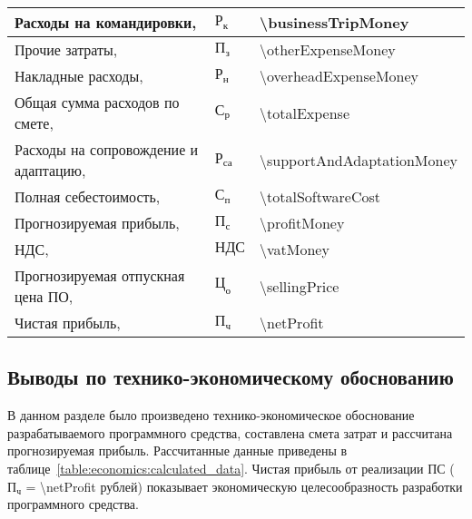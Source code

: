 \begin{longtable}{| >{\raggedright}m{}
                  | >{\centering}m{}
                  | >{\centering\arraybackslash}m{}|}
    Расходы на командировки, \byr{}
    & $ \text{Р}_\text{к} $
    & \num{\businessTripMoney}
    \\ \hline

    Прочие затраты, \byr{}
    & $ \text{П}_\text{з} $
    & \num{\otherExpenseMoney}
    \\ \hline

    Накладные расходы, \byr{}
    & $ \text{Р}_\text{н} $
    & \num{\overheadExpenseMoney}
    \\ \hline

    Общая сумма расходов по смете, \byr{}
    & $ \text{С}_\text{р} $
    & \num{\totalExpense}
    \\ \hline

    Расходы на сопровождение и адаптацию, \byr{}
    & $ \text{Р}_\text{са} $
    & \num{\supportAndAdaptationMoney}
    \\ \hline

    Полная себестоимость, \byr{}
    & $ \text{С}_\text{п} $
    & \num{\totalSoftwareCost}
    \\ \hline

    Прогнозируемая прибыль, \byr{}
    & $ \text{П}_\text{с} $
    & \num{\profitMoney}
    \\ \hline

    НДС, \byr{}
    & $ \text{НДС} $
    & \num{\vatMoney}
    \\ \hline

    Прогнозируемая отпускная цена ПО, \byr{}
    & $ \text{Ц}_\text{о} $
    & \num{\sellingPrice}
    \\ \hline

    Чистая прибыль, \byr{}
    & $ \text{П}_\text{ч} $
    & \num{\netProfit}
    \\ \hline
\end{longtable}

\subsection{Выводы по технико-экономическому обоснованию}

В данном разделе было произведено технико-экономическое обоснование разрабатываемого программного средства, составлена смета затрат и рассчитана прогнозируемая прибыль. Рассчитанные данные приведены в таблице~\ref{table:economics:calculated_data}.
Чистая прибыль от реализации ПС ($ \text{П}_\text{ч} $ = \num{\netProfit} рублей) показывает экономическую целесообразность разработки программного средства.

\clearpage
